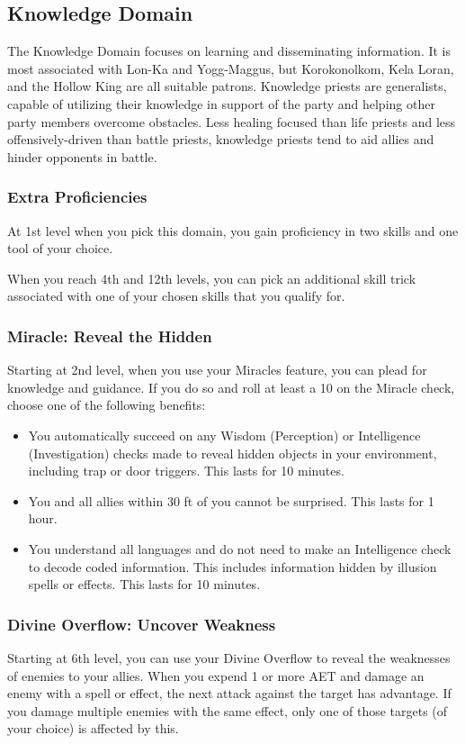\subsection{Knowledge Domain}

The Knowledge Domain focuses on learning and disseminating information. It is most associated with Lon-Ka and Yogg-Maggus, but Korokonolkom, Kela Loran, and the Hollow King are all suitable patrons. Knowledge priests are generalists, capable of utilizing their knowledge in support of the party and helping other party members overcome obstacles. Less healing focused than life priests and less offensively-driven than battle priests, knowledge priests tend to aid allies and hinder opponents in battle.

\subsubsection{Extra Proficiencies}
At 1st level when you pick this domain, you gain proficiency in two skills and one tool of your choice.

When you reach 4th and 12th levels, you can pick an additional skill trick associated with one of your chosen skills that you qualify for.

\subsubsection{Miracle: Reveal the Hidden}
Starting at 2nd level, when you use your Miracles feature, you can plead for knowledge and guidance. If you do so and roll at least a 10 on the Miracle check, choose one of the following benefits:
\begin{itemize}
	\item You automatically succeed on any Wisdom (Perception) or Intelligence (Investigation) checks made to reveal hidden objects in your environment, including trap or door triggers. This lasts for 10 minutes.
	\item You and all allies within 30 ft of you cannot be surprised. This lasts for 1 hour.
	\item You understand all languages and do not need to make an Intelligence check to decode coded information. This includes information hidden by illusion spells or effects. This lasts for 10 minutes.
\end{itemize}

\subsubsection{Divine Overflow: Uncover Weakness}
Starting at 6th level, you can use your Divine Overflow to reveal the weaknesses of enemies to your allies. When you expend 1 or more AET and damage an enemy with a spell or effect, the next attack against the target has advantage. If you damage multiple enemies with the same effect, only one of those targets (of your choice) is affected by this.

